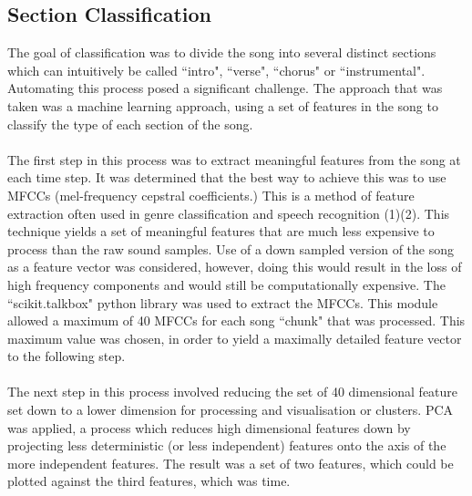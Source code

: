 \subsection{Section Classification}
The goal of classification was to divide the song into several distinct sections which can intuitively be called ``intro", ``verse", ``chorus" or ``instrumental". Automating this process posed a significant challenge. The approach that was taken was a machine learning approach, using a set of features in the song to classify the type of each section of the song. \\
\\
The first step in this process was to extract meaningful features from the song at each time step. It was determined that the best way to achieve this was to use MFCCs (mel-frequency cepstral coefficients.) This is a method of feature extraction often used in genre classification and speech recognition (1)(2). This technique yields a set of meaningful features that are much less expensive to process than the raw sound samples. Use of a down sampled version of the song as a feature vector was considered, however, doing this would result in the loss of high frequency components and would still be computationally expensive. The ``scikit.talkbox" python library was used to extract the MFCCs. This module allowed a maximum of 40 MFCCs for each song ``chunk" that was processed. This maximum value was chosen, in order to yield a maximally detailed feature vector to the following step.\\
\\
The next step in this process involved reducing the set of 40 dimensional feature set down to a lower dimension for processing and visualisation or clusters. PCA was applied, a process which reduces high dimensional features down by projecting less deterministic (or less independent) features onto the axis of the more independent features. The result was a set of two features, which could be plotted against the third features, which was time. \\
\\
